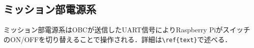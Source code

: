 \subsection{ミッション部電源系}
ミッション部電源系はOBCが送信したUART信号によりRaspberry PiがスイッチのON/OFFを切り替えることで操作される．詳細は\verb|\ref{text}|で述べる．